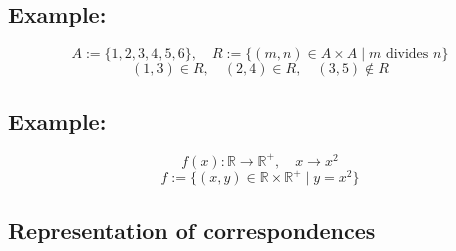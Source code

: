 \documentclass[11pt]{article}
\begin{document}
\subsection*{Example:}
\[
A := \{1, 2, 3, 4, 5, 6\}, \quad R := \{(m,n) \in A \times A \mid m \text{ divides } n\}
\]
\[
(1,3) \in R, \quad (2,4) \in R, \quad (3,5) \notin R
\]

\subsection*{Example:}
\[
f(x) : \mathbb{R} \rightarrow \mathbb{R}^+, \quad x \rightarrow x^2
\]
\[
f := \{(x,y) \in \mathbb{R} \times \mathbb{R}^+ \mid y = x^2\}
\]

\subsection{Representation of correspondences}
\end{document}
